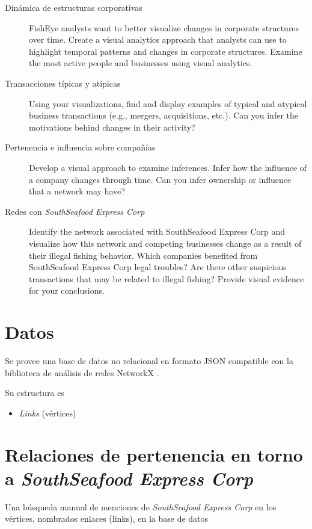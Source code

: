 \documentclass[11pt,spanish,a4paper]{article}
\begin{document}
\begin{description}
	\item[Dinámica de estructuras corporativas]
    FishEye analysts want to better visualize changes in corporate structures over time. Create a visual analytics approach that analysts can use to highlight temporal patterns and changes in corporate structures. Examine the most active people and businesses using visual analytics.
	\item[Transacciones típicas y atípicas]
    Using your visualizations, find and display examples of typical and atypical business transactions (e.g., mergers, acquisitions, etc.). Can you infer the motivations behind changes in their activity?
	\item[Pertenencia e influencia sobre compañías]
		Develop a visual approach to examine inferences. Infer how the influence of a company changes through time. Can you infer ownership or influence that a network may have?
	\item[Redes con \emph{SouthSeafood Express Corp}]
    Identify the network associated with SouthSeafood Express Corp and visualize how this network and competing businesses change as a result of their illegal fishing behavior. Which companies benefited from SouthSeafood Express Corp legal troubles? Are there other suspicious transactions that may be related to illegal fishing? Provide visual evidence for your conclusions.
\end{description}


\section{Datos}
Se provee una base de datos no relacional en formato JSON compatible con la biblioteca de análisis de redes NetworkX \cite{noauthor_networkx_nodate}.

Su estructura es
\begin{itemize}
	\item \emph{Links} (vértices) 
\end{itemize}


\section{Relaciones de pertenencia en torno a \emph{SouthSeafood Express Corp}}

Una búsqueda manual de menciones de \emph{SouthSeafood Express Corp} en los vértices, nombrados enlaces (links), en la base de datos
\end{document}
